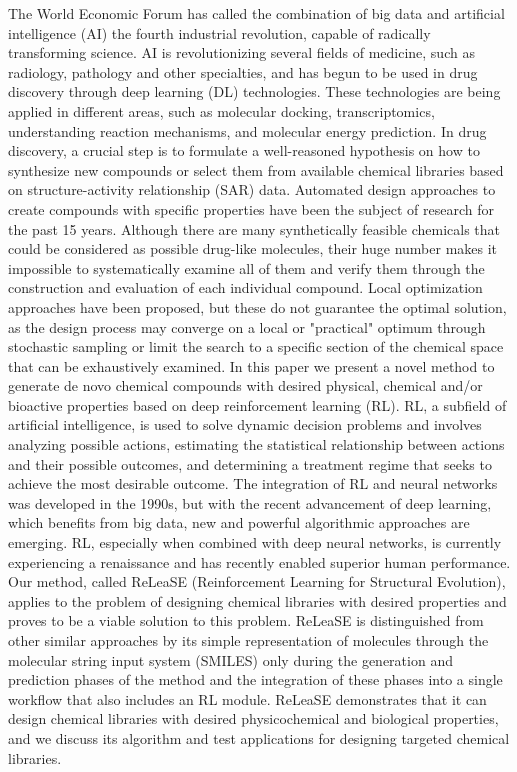 \documentclass[conference]{IEEEtran}
\begin{document}
The World Economic Forum has called the combination of big data and artificial intelligence (AI) the fourth industrial revolution, capable of radically transforming science. AI is revolutionizing several fields of medicine, such as radiology, pathology and other specialties, and has begun to be used in drug discovery through deep learning (DL) technologies. These technologies are being applied in different areas, such as molecular docking, transcriptomics, understanding reaction mechanisms, and molecular energy prediction.
In drug discovery, a crucial step is to formulate a well-reasoned hypothesis on how to synthesize new compounds or select them from available chemical libraries based on structure-activity relationship (SAR) data. Automated design approaches to create compounds with specific properties have been the subject of research for the past 15 years. Although there are many synthetically feasible chemicals that could be considered as possible drug-like molecules, their huge number makes it impossible to systematically examine all of them and verify them through the construction and evaluation of each individual compound. Local optimization approaches have been proposed, but these do not guarantee the optimal solution, as the design process may converge on a local or "practical" optimum through stochastic sampling or limit the search to a specific section of the chemical space that can be exhaustively examined.
In this paper we present a novel method to generate de novo chemical compounds with desired physical, chemical and/or bioactive properties based on deep reinforcement learning (RL). RL, a subfield of artificial intelligence, is used to solve dynamic decision problems and involves analyzing possible actions, estimating the statistical relationship between actions and their possible outcomes, and determining a treatment regime that seeks to achieve the most desirable outcome. The integration of RL and neural networks was developed in the 1990s, but with the recent advancement of deep learning, which benefits from big data, new and powerful algorithmic approaches are emerging. RL, especially when combined with deep neural networks, is currently experiencing a renaissance and has recently enabled superior human performance. 
Our method, called ReLeaSE (Reinforcement Learning for Structural Evolution), applies to the problem of designing chemical libraries with desired properties and proves to be a viable solution to this problem. ReLeaSE is distinguished from other similar approaches by its simple representation of molecules through the molecular string input system (SMILES) only during the generation and prediction phases of the method and the integration of these phases into a single workflow that also includes an RL module. ReLeaSE demonstrates that it can design chemical libraries with desired physicochemical and biological properties, and we discuss its algorithm and test applications for designing targeted chemical libraries.
\end{document}
